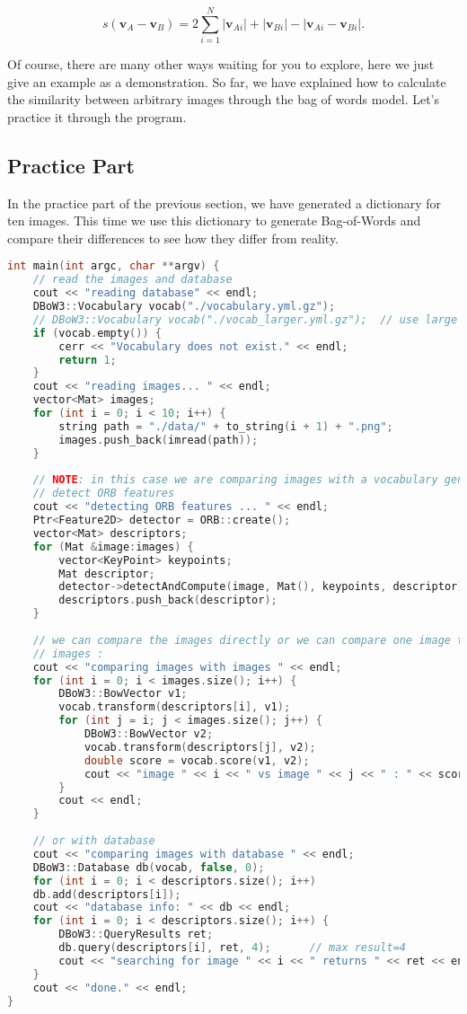 \begin{equation}
	s\left( {{\bm{v}_A} - {\bm{v}_B}} \right) = 2\sum\limits_{i = 1}^N {\left| {{\bm{v}_{Ai}}} \right| + \left| {{\bm{v}_{Bi}}} \right| - \left| {{\bm{v}_{Ai}} - {\bm{v}_{Bi}}} \right|}.
\end{equation}

Of course, there are many other ways waiting for you to explore, here we just give an example as a demonstration. So far, we have explained how to calculate the similarity between arbitrary images through the bag of words model. Let's practice it through the program.

\subsection{Practice Part}
In the practice part of the previous section, we have generated a dictionary for ten images. This time we use this dictionary to generate Bag-of-Words and compare their differences to see how they differ from reality.

\begin{lstlisting}[language=c++,caption=slambook/ch12/loop\_closure.cpp]
int main(int argc, char **argv) {
	// read the images and database  
	cout << "reading database" << endl;
	DBoW3::Vocabulary vocab("./vocabulary.yml.gz");
	// DBoW3::Vocabulary vocab("./vocab_larger.yml.gz");  // use large vocab if you want: 
	if (vocab.empty()) {
		cerr << "Vocabulary does not exist." << endl;
		return 1;
	}
	cout << "reading images... " << endl;
	vector<Mat> images;
	for (int i = 0; i < 10; i++) {
		string path = "./data/" + to_string(i + 1) + ".png";
		images.push_back(imread(path));
	}
	
	// NOTE: in this case we are comparing images with a vocabulary generated by themselves, this may lead to overfit.
	// detect ORB features
	cout << "detecting ORB features ... " << endl;
	Ptr<Feature2D> detector = ORB::create();
	vector<Mat> descriptors;
	for (Mat &image:images) {
		vector<KeyPoint> keypoints;
		Mat descriptor;
		detector->detectAndCompute(image, Mat(), keypoints, descriptor);
		descriptors.push_back(descriptor);
	}
	
	// we can compare the images directly or we can compare one image to a database 
	// images :
	cout << "comparing images with images " << endl;
	for (int i = 0; i < images.size(); i++) {
		DBoW3::BowVector v1;
		vocab.transform(descriptors[i], v1);
		for (int j = i; j < images.size(); j++) {
			DBoW3::BowVector v2;
			vocab.transform(descriptors[j], v2);
			double score = vocab.score(v1, v2);
			cout << "image " << i << " vs image " << j << " : " << score << endl;
		}
		cout << endl;
	}
	
	// or with database 
	cout << "comparing images with database " << endl;
	DBoW3::Database db(vocab, false, 0);
	for (int i = 0; i < descriptors.size(); i++)
	db.add(descriptors[i]);
	cout << "database info: " << db << endl;
	for (int i = 0; i < descriptors.size(); i++) {
		DBoW3::QueryResults ret;
		db.query(descriptors[i], ret, 4);      // max result=4
		cout << "searching for image " << i << " returns " << ret << endl << endl;
	}
	cout << "done." << endl;
}
\end{lstlisting}

